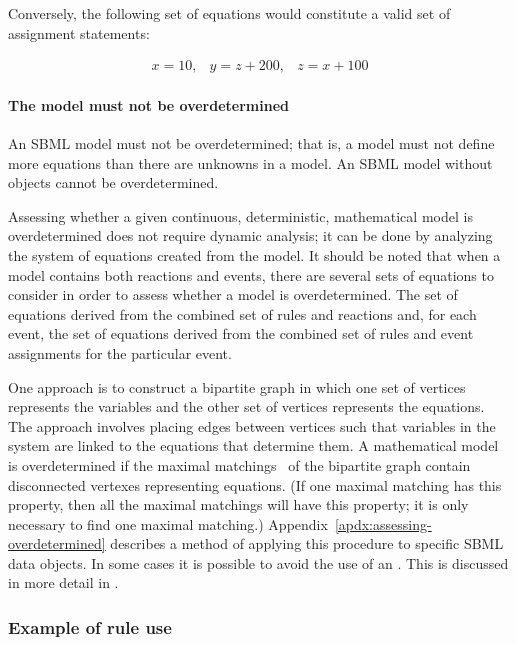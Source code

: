 Conversely, the following set of equations would constitute a
valid set of assignment statements:
\begin{linenomath}
\begin{equation*}
  \begin{array}{lll}
    x = 10, & y = z + 200, & z = x + 100
  \end{array}
\end{equation*}
\end{linenomath}


\paragraph{The model must not be overdetermined}

An SBML model must not be overdetermined; that is, a model must
not define more equations than there are unknowns in a model.  An
SBML model without \AlgebraicRule objects cannot be
overdetermined.

Assessing whether a given continuous, deterministic, mathematical
model is overdetermined does not require dynamic analysis; it can
be done by analyzing the system of equations created from the
model.  It should be noted that when a model contains both
reactions and events, there are several sets of equations to
consider in order to assess whether a model is overdetermined.
The set of equations derived from the combined set of rules and
reactions and, for each event, the set of equations derived from
the combined set of rules and event assignments for the particular
event.

One approach is to construct a bipartite graph in which one set of
vertices represents the variables and the other set of vertices
represents the equations.  The approach involves placing edges
between vertices such that variables in the system are linked to
the equations that determine them.  A mathematical model is
overdetermined if the maximal matchings~\citep{chartrand_1977} of
the bipartite graph contain disconnected vertexes representing
equations.  (If one maximal matching has this property, then all
the maximal matchings will have this property; \ie it is only
necessary to find one maximal matching.)
Appendix~\ref{apdx:assessing-overdetermined} describes a method of
applying this procedure to specific SBML data objects.  In some
cases it is possible to avoid the use of an \AlgebraicRule.  This
is discussed in more detail in .


\subsubsection{Example of rule use}
\label{sec:eg-rule-use}

